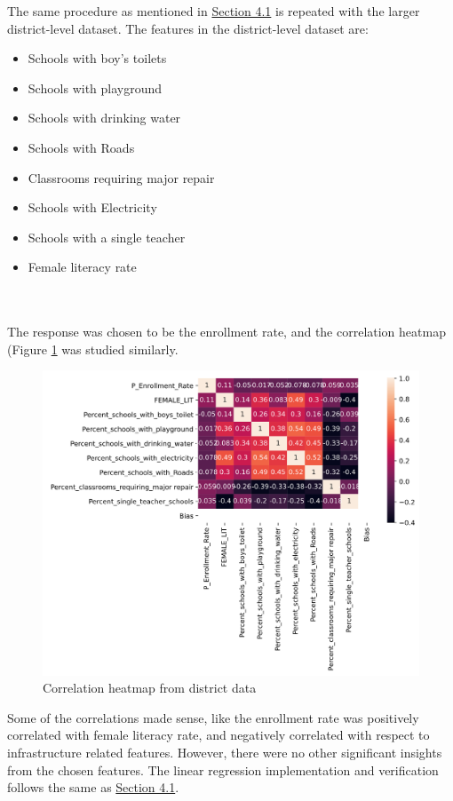 \documentclass{article}
\begin{document}
The same procedure as mentioned in \hyperref[sec:4.1]{Section 4.1} is repeated with the larger district-level dataset. 
The features in the district-level dataset are: \\
\begin{minipage}[t]{.33\textwidth}
\begin{itemize}
\item Schools with boy's toilets
\item Schools with playground
\item Schools with drinking water
\end{itemize}
\end{minipage}
\begin{minipage}[t]{.33\textwidth}
\begin{itemize}
\item Schools with Roads
\item Classrooms requiring major repair
\item Schools with Electricity
\end{itemize}
\end{minipage}
\begin{minipage}[t]{.33\textwidth}
\begin{itemize}
\item Schools with a single teacher
\item Female literacy rate 
\end{itemize}
\end{minipage}
\\\\
The response was chosen to be the enrollment rate, and the correlation heatmap (Figure \ref{fig:fig2} was studied similarly. 
\begin{figure}[H]
\centering
  \includegraphics[width=0.75\linewidth]{figures/enroll_HM_Dist.png}
  \caption{Correlation heatmap from district data}
  \label{fig:fig2}
\end{figure}
Some of the correlations made sense, like the enrollment rate was positively correlated with female literacy rate, and negatively correlated with respect to infrastructure related features. However, there were no other significant insights from the chosen features. The linear regression implementation and verification follows the same as \hyperref[sec:4.1]{Section 4.1}.
\end{document}

